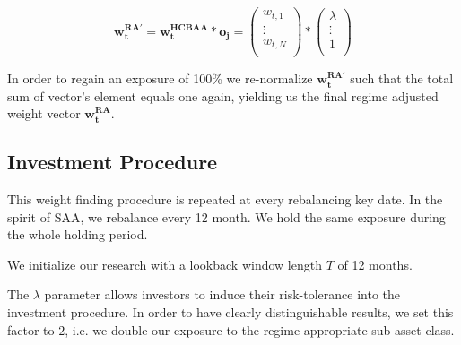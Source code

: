 \begin{equation}
    \mathbf{w_t^{RA'}} = \mathbf{w_t^{HCBAA}} * \mathbf{o_j} = \left( \begin{matrix} w_{t,1}  \\ \vdots  \\ w_{t,N} \\ \end{matrix} \right) * \left( \begin{matrix} \lambda  \\ \vdots  \\ 1 \\ \end{matrix} \right)
\end{equation}{}

In order to regain an exposure of 100\% we re-normalize $\mathbf{w_t^{RA'}}$ such that the total sum of vector's element equals one again, yielding us the final regime adjusted weight vector $\mathbf{w_t^{RA}}$.

\subsection{Investment Procedure}

This weight finding procedure is repeated at every rebalancing key date. In the spirit of SAA, we rebalance every 12 month. We hold the same exposure during the whole holding period. 

We initialize our research with a lookback window length $T$ of 12 months.  

The $\lambda$ parameter allows investors to induce their risk-tolerance into the investment procedure. In order to have clearly distinguishable results, we set this factor to $2$, i.e. we double our exposure to the regime appropriate sub-asset class.

